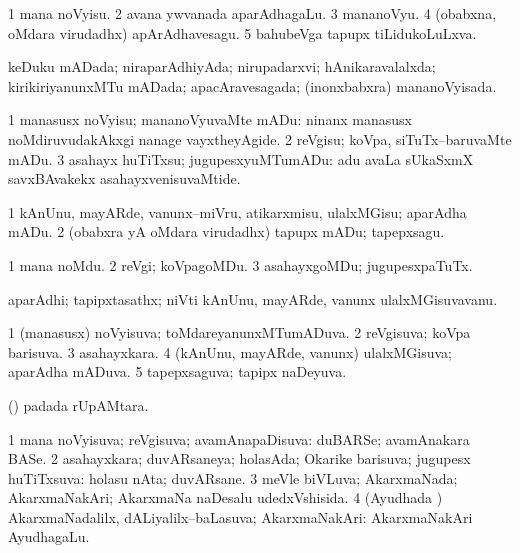 \noindent
\gl{\pagu}
\bmng
\bnum
\num{1}  mana noVyisu. 
\num{2}  avana ywvanada aparAdhagaLu. 
\num{3}  mananoVyu. 
\num{4}  (obabxna, oMdara virudadhx) apArAdhavesagu. 
\num{5}  bahubeVga tapupx tiLidukoLuLxva. 
\enum
\emng
\eentry

\bentry
{}
\gl{\gu}
\bmng
keDuku mADada; niraparAdhiyAda; nirupadarxvi; hAnikaravalalxda; kirikiriyanunxMTu mADada; apacAravesagada; (inonxbabxra) mananoVyisada. 
\emng
\eentry

\bentry
{}
\gl{\sakirx}
\bmng
\bnum
\num{1} manasusx noVyisu; mananoVyuvaMte mADu:  ninanx manasusx noMdiruvudakAkxgi nanage vayxtheyAgide. 
\num{2} reVgisu; koVpa, siTuTx--baruvaMte mADu. 
\num{3} asahayx huTiTxsu; jugupesxyuMTumADu:  adu avaLa sUkaSxmX savxBAvakekx asahayxvenisuvaMtide. 
\enum
\emng

\noindent
\gl{\akirx}
\bmng
\bnum
\num{1} kAnUnu, mayARde, \mo vanunx--miVru, atikarxmisu, ulalxMGisu; aparAdha mADu. 
\num{2} (obabxra yA oMdara virudadhx) tapupx mADu; tapepxsagu. 
\enum
\emng
\eentry

\bentry
{}
\gl{\kirxvi}
\bmng
\bnum
\num{1} mana noMdu. 
\num{2} reVgi; koVpagoMDu. 
\num{3} asahayxgoMDu; jugupesxpaTuTx. 
\enum
\emng
\eentry

\bentry
{}
\gl{\nA}
\bmng
aparAdhi; tapipxtasathx; niVti kAnUnu, mayARde, \mo vanunx ulalxMGisuvavanu. 
\emng
\eentry

\bentry
{}
\gl{\gu}
\bmng
\bnum
\num{1} (manasusx) noVyisuva; toMdareyanunxMTumADuva. 
\num{2} reVgisuva; koVpa barisuva. 
\num{3} asahayxkara. 
\num{4} (kAnUnu, mayARde, \mo vanunx) ulalxMGisuva; aparAdha mADuva. 
\num{5} tapepxsaguva; tapipx naDeyuva. 
\enum
\emng
\eentry

\bentry
{}
\gl{\nA}
\bmng
(\ame)  padada rUpAMtara. 
\emng
\eentry

\bentry
{}
\gl{\nA}
\bmng
\bnum
\num{1} mana noVyisuva; reVgisuva; avamAnapaDisuva:  duBARSe; avamAnakara BASe. 
\num{2} asahayxkara; duvARsaneya; holasAda; Okarike barisuva; jugupesx huTiTxsuva:  holasu nAta; duvARsane. 
\num{3} meVle biVLuva; AkarxmaNada; AkarxmaNakAri; AkarxmaNa naDesalu udedxVshisida. 
\num{4} (Ayudhada \vi) AkarxmaNadalilx, dALiyalilx--baLasuva; AkarxmaNakAri:  AkarxmaNakAri AyudhagaLu. 
\enum
\emng
\eentry

